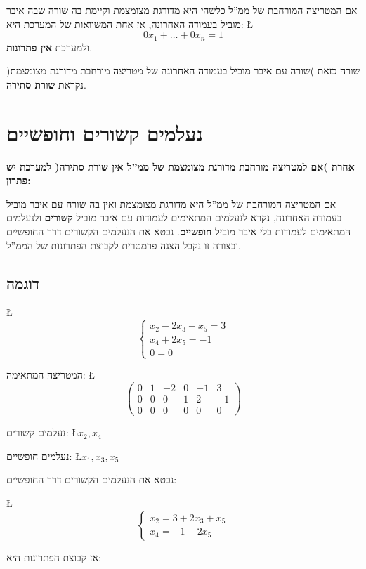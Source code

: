 \documentclass[english,hebrew]{article}
\begin{document}
אם המטריצה המורחבת של ממ\textquotedblright ל כלשהי היא מדורגת מצומצמת
וקיימת בה שורה שבה איבר מוביל בעמודה האחרונה, אז אחת המשוואות של המערכת
היא: \L{%
\[
0x_{1}+\dots+0x_{n}=1
\]
}%
ולמערכת \textbf{אין פתרונות}.

שורה כזאת )שורה עם איבר מוביל בעמודה האחרונה של מטריצה מורחבת מדורגת
מצומצמת( נקראת \textbf{שורת סתירה}.

\bigskip{}

\section{נעלמים קשורים וחופשיים}

\textbf{אחרת )אם למטריצה מורחבת מדורגת מצומצמת של ממ\textquotedblright ל
אין שורת סתירה( למערכת יש פתרון:}

אם המטריצה המורחבת של ממ\textquotedblright ל היא מדורגת מצומצמת ואין
בה שורה עם איבר מוביל בעמודה האחרונה, נקרא לנעלמים המתאימים לעמודות
עם איבר מוביל \textbf{קשורים} ולנעלמים המתאימים לעמודות בלי איבר מוביל
\textbf{חופשיים}. נבטא את הנעלמים הקשורים דרך החופשיים ובצורה זו נקבל
הצגה פרמטרית לקבוצת הפתרונות של הממ\textquotedblright ל.

\subsection{דוגמה }

\L{%
\[
\begin{cases}
x_{2}-2x_{3}-x_{5}=3\\
x_{4}+2x_{5}=-1\\
0=0
\end{cases}
\]
}%

המטריצה המתאימה: \L{%
\[
\left(\begin{array}{ccccc|c}
0 & 1 & -2 & 0 & -1 & 3\\
0 & 0 & 0 & 1 & 2 & -1\\
0 & 0 & 0 & 0 & 0 & 0
\end{array}\right)
\]
}%

נעלמים קשורים: \L{$x_{2},x_{4}$}

נעלמים חופשיים: \L{$x_{1},x_{3},x_{5}$}

נבטא את הנעלמים הקשורים דרך החופשיים:

\L{%
\[
\begin{cases}
x_{2}=3+2x_{3}+x_{5}\\
x_{4}=-1-2x_{5}
\end{cases}
\]
}%

אז קבוצת הפתרונות היא:
\end{document}
